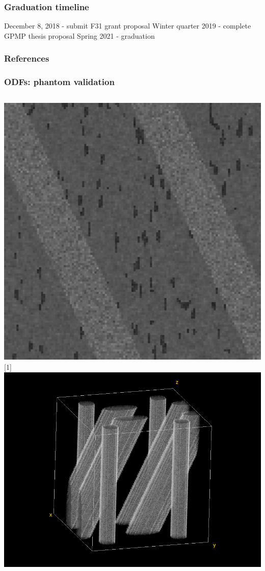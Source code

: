 \documentclass[presentation, 10pt]{beamer}
\begin{document}
\begin{frame}
  \frametitle{Graduation timeline}
  \begin{outline}
    \1 December 8, 2018 - submit F31 grant proposal
    \1 Winter quarter 2019 - complete GPMP thesis proposal
    \1 Spring 2021 - graduation 
  \end{outline}
\end{frame}

\begin{frame}[allowframebreaks]
  \frametitle{References}
  \printbibliography
\end{frame}

\begin{frame}
  \frametitle{\bolduct ODFs: phantom validation}
  \begin{columns}
    \begin{column}{0.48\textwidth}
      \begin{center}
        \includegraphics[height=0.42\textheight]{figs/phant25_angle}
        \vspace{4em}
        \scalebox{-1}[1]{\includegraphics[height=0.42\textheight]{figs/phantom_volume}}

\end{center}
\end{column}
\end{columns}
\end{frame}
\end{document}
